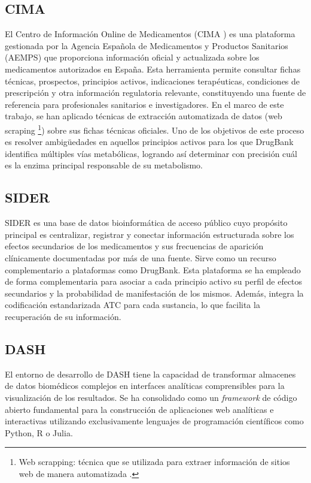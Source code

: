 \subsection*{CIMA}
El Centro de Información Online de Medicamentos (CIMA \cite{cima}) es una plataforma gestionada por la Agencia Española de Medicamentos y Productos Sanitarios (AEMPS) que proporciona información oficial y actualizada sobre los medicamentos autorizados en España. Esta herramienta permite consultar fichas técnicas, prospectos, principios activos, indicaciones terapéuticas, condiciones de prescripción y otra información regulatoria relevante, constituyendo una fuente de referencia para profesionales sanitarios e investigadores. 
En el marco de este trabajo, se han aplicado técnicas de extracción automatizada de datos (web scraping \footnote{Web scrapping: técnica que se utilizada para extraer información de sitios web de manera automatizada \cite{esic_web_scraping}.}) sobre sus fichas técnicas oficiales. Uno de los objetivos de este proceso es resolver ambigüedades en aquellos principios activos para los que DrugBank identifica múltiples vías metabólicas, logrando así determinar con precisión cuál es la enzima principal responsable de su metabolismo.

\subsection*{SIDER}
SIDER \cite{sider} es una base de datos bioinformática de acceso público cuyo propósito principal es centralizar, registrar y conectar información estructurada sobre los efectos secundarios de los medicamentos y sus frecuencias de aparición clínicamente documentadas por más de una fuente. Sirve como un recurso complementario a plataformas como DrugBank.
Esta plataforma se ha empleado de forma complementaria para asociar a cada principio activo su perfil de efectos secundarios y la probabilidad de manifestación de los mismos. Además, integra la codificación estandarizada ATC para cada sustancia, lo que facilita la recuperación de su información.

\subsection*{DASH}
El entorno de desarrollo de DASH \cite{dash_framework} tiene la capacidad de transformar almacenes de datos biomédicos complejos en interfaces analíticas comprensibles para la visualización de los resultados. Se ha consolidado como un \textit{framework} de código abierto fundamental para la construcción de aplicaciones web analíticas e interactivas utilizando exclusivamente lenguajes de programación científicos como Python, R o Julia.



